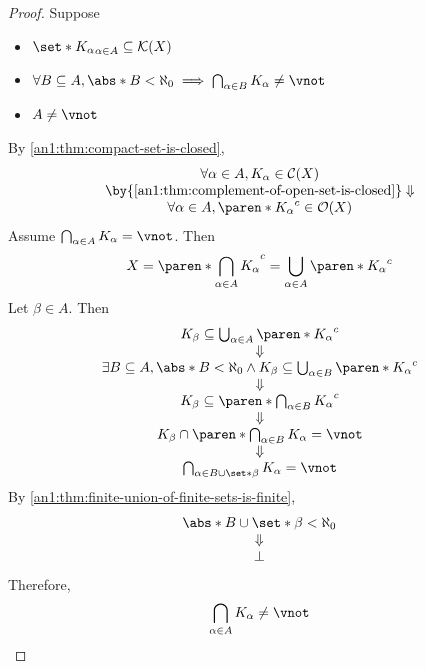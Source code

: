 \begin{proof}
  Suppose
  \begin{itemize}
    \item $\set*{K_{\alpha}}_{\alpha \in A} \subseteq \mathcal{K}(X)$
    \item $\forall B \subseteq A, \abs*{B} < \aleph_{0} \implies \bigcap_{\alpha \in B} K_{\alpha} \neq \vnot$
    \item $A \neq \vnot$
  \end{itemize}
  By \cref{an1:thm:compact-set-is-closed},
  \[
    \begin{array}{c}
      \forall \alpha \in A, K_{\alpha} \in \mathcal{C}(X)              \\
      \by{\Cref{an1:thm:complement-of-open-set-is-closed}} \Downarrow  \\
      \forall \alpha \in A, \paren*{K_{\alpha}}^{c} \in \mathcal{O}(X) \\
    \end{array}
  \]
  Assume $\bigcap_{\alpha \in A} K_{\alpha} = \vnot$. Then
  \[
    X = \paren*{\bigcap_{\alpha \in A} K_{\alpha}}^{c} = \bigcup_{\alpha \in A} \paren*{K_{\alpha}}^{c}
  \]
  Let $\beta \in A$. Then
  \[
    \begin{array}{c}
      K_{\beta} \subseteq \bigcup_{\alpha \in A} \paren*{K_{\alpha}}^{c} \\
      \Downarrow                                                         \\
      \exists B \subseteq A, \abs*{B} < \aleph_{0} \land
      K_{\beta} \subseteq \bigcup_{\alpha \in B} \paren*{K_{\alpha}}^{c} \\
      \Downarrow                                                         \\
      K_{\beta} \subseteq \paren*{\bigcap_{\alpha \in B} K_{\alpha}}^{c} \\
      \Downarrow                                                         \\
      K_{\beta} \cap \paren*{\bigcap_{\alpha \in B} K_{\alpha}} = \vnot  \\
      \Downarrow                                                         \\
      \bigcap_{\alpha \in B \cup \set*{\beta}} K_{\alpha} = \vnot
    \end{array}
  \]
  By \cref{an1:thm:finite-union-of-finite-sets-is-finite},
  \[
    \begin{array}{c}
      \abs*{B \cup \set*{\beta}} < \aleph_{0} \\
      \Downarrow                              \\
      \bot
    \end{array}
  \]
  Therefore,
  \[
    \bigcap_{\alpha \in A} K_{\alpha} \neq \vnot
  \]
\end{proof}

